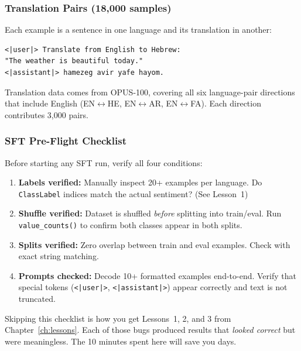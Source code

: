 \documentclass[11pt,a4paper]{article}
\begin{document}
\subsubsection{Translation Pairs (18,000 samples)}

Each example is a sentence in one language and its translation in another:

\begin{lstlisting}[language={}, title={Example: Translation pair}]
<|user|> Translate from English to Hebrew:
"The weather is beautiful today."
<|assistant|> hamezeg avir yafe hayom.
\end{lstlisting}

Translation data comes from OPUS-100, covering all six language-pair directions that include English (EN$\leftrightarrow$HE, EN$\leftrightarrow$AR, EN$\leftrightarrow$FA). Each direction contributes 3,000 pairs.

\subsubsection{SFT Pre-Flight Checklist}

Before starting any SFT run, verify all four conditions:

\begin{enumerate}[nosep]
  \item[$\square$] \textbf{Labels verified:} Manually inspect 20+ examples per language. Do \texttt{ClassLabel} indices match the actual sentiment? (See Lesson~1)
  \item[$\square$] \textbf{Shuffle verified:} Dataset is shuffled \emph{before} splitting into train/eval. Run \texttt{value\_counts()} to confirm both classes appear in both splits.
  \item[$\square$] \textbf{Splits verified:} Zero overlap between train and eval examples. Check with exact string matching.
  \item[$\square$] \textbf{Prompts checked:} Decode 10+ formatted examples end-to-end. Verify that special tokens (\texttt{<|user|>}, \texttt{<|assistant|>}) appear correctly and text is not truncated.
\end{enumerate}

\begin{warning}
Skipping this checklist is how you get Lessons~1, 2, and 3 from Chapter~\ref{ch:lessons}. Each of those bugs produced results that \emph{looked correct} but were meaningless. The 10 minutes spent here will save you days.
\end{warning}
\end{document}

